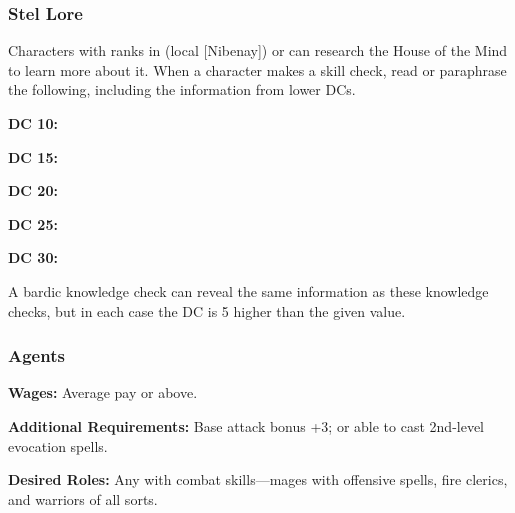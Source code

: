 \subsubsection{Stel Lore}
Characters with ranks in  (local [Nibenay]) or  can research the House of the Mind to learn more about it. When a character makes a skill check, read or paraphrase the following, including the information from lower DCs.

\textbf{DC 10:}

\textbf{DC 15:}

\textbf{DC 20:}

\textbf{DC 25:}

\textbf{DC 30:}

A bardic knowledge check can reveal the same information as these knowledge checks, but in each case the DC is 5 higher than the given value.

\subsubsection{Agents}

\textbf{Wages:} Average pay or above.

\textbf{Additional Requirements:} Base attack bonus +3; or able to cast 2nd-level evocation spells.

\textbf{Desired Roles:} Any with combat skills---mages with offensive spells, fire clerics, and warriors of all sorts.